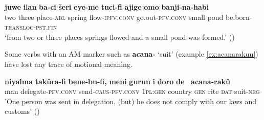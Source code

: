 \documentclass{article}
\newcommand{\ipa}[1]{\textbf{{\phon\mbox{#1}}}} %
\begin{document}


\begin{exe}
\ex 
\gll
\ipa{juwe} 	\ipa{ilan} 	\ipa{ba-ci} 	\ipa{šeri} 	\ipa{eye-me} 	\ipa{tuci-fi} 	\ipa{ajige} 	\ipa{omo} 	\ipa{banji-na-habi} \\
two three place-\textsc{abl} spring flow-\textsc{ipfv.conv} go.out-\textsc{pfv.conv} small pond be.born-\textsc{transloc-pst.fin} \\
‘from two or three places springs flowed and a small pond was formed.’ (\citealt[68;14b]{shunjuu64tulishen})
\end{exe}

Some verbs with an AM marker such as \ipa{acana-} `suit' (example \ref{ex:acanarakuu}) have lost any trace of motional meaning.

\begin{exe}
\ex \label{ex:acanarakuu}
\gll
\ipa{niyalma} 	\ipa{takûra-fi} 	\ipa{bene-bu-fi,} 	\ipa{meni} 	\ipa{gurun} 	\ipa{i} 	\ipa{doro} 	\ipa{de } 	\ipa{acana-rakû} \\
man delegate-\textsc{pfv.conv} send-\textsc{caus}-\textsc{pfv.conv} \textsc{1pl:gen} country \textsc{gen} rite \textsc{dat} suit-\textsc{neg} \\
\glt  'One person was sent in delegation, (but) he does not comply with our laws and customs' (\citealt[XXX]{shunjuu64tulishen})
\end{exe} 
\end{document}
